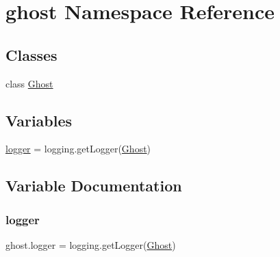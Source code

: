 \hypertarget{namespaceghost}{}\section{ghost Namespace Reference}
\label{namespaceghost}
\subsection*{Classes}
\begin{DoxyCompactItemize}
\item 
class \hyperlink{classghost_1_1_ghost}{Ghost}
\end{DoxyCompactItemize}
\subsection*{Variables}
\begin{DoxyCompactItemize}
\item 
\hyperlink{namespaceghost_ac7053f8a651cd4f2115dba64dc8f0fae}{logger} = logging.\+get\+Logger(\textquotesingle{}\hyperlink{classghost_1_1_ghost}{Ghost}\textquotesingle{})
\end{DoxyCompactItemize}


\subsection{Variable Documentation}
\mbox{\label{namespaceghost_ac7053f8a651cd4f2115dba64dc8f0fae}} 
\subsubsection{\texorpdfstring{logger}{logger}}
{\footnotesize\ttfamily ghost.\+logger = logging.\+get\+Logger(\textquotesingle{}\hyperlink{classghost_1_1_ghost}{Ghost}\textquotesingle{})}

